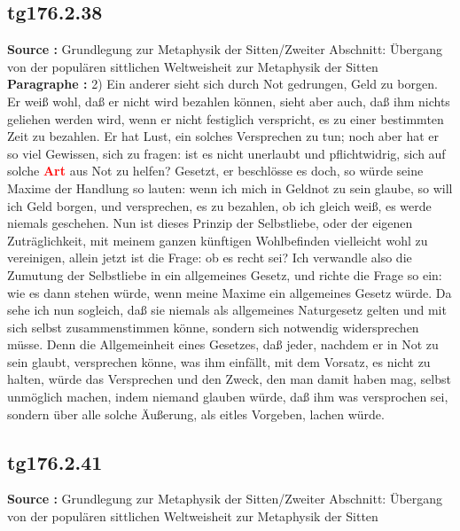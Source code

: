 \documentclass[a4paper,12pt,twoside]{book}
\newcommand{\match}[1]{\textcolor{red}{\textbf{#1}}}
\begin{document}
	\subsection*{tg176.2.38} 
	\textbf{Source : }Grundlegung zur Metaphysik der Sitten/Zweiter Abschnitt: Übergang von der populären sittlichen Weltweisheit zur Metaphysik der Sitten\\  
	
	\noindent\textbf{Paragraphe : }2) Ein anderer sieht sich durch Not gedrungen, Geld zu borgen. Er weiß wohl, daß er nicht wird bezahlen können, sieht aber auch, daß ihm nichts geliehen werden wird, wenn er nicht festiglich verspricht, es zu einer bestimmten Zeit zu bezahlen. Er hat Lust, ein solches Versprechen zu tun; noch aber hat er so viel Gewissen, sich zu fragen: ist es nicht unerlaubt und pflichtwidrig, sich auf solche \match{Art} aus Not zu helfen? Gesetzt, er beschlösse es doch, so würde seine Maxime der Handlung so lauten: wenn ich mich in Geldnot zu sein glaube, so will ich Geld borgen, und versprechen, es zu bezahlen, ob ich gleich weiß, es werde niemals geschehen. Nun ist dieses Prinzip der Selbstliebe, oder der eigenen Zuträglichkeit, mit meinem ganzen künftigen Wohlbefinden vielleicht wohl zu vereinigen, allein jetzt ist die Frage: ob es recht sei? Ich verwandle also die Zumutung der Selbstliebe in ein allgemeines Gesetz, und richte die Frage so ein: wie es dann stehen würde, wenn meine Maxime ein allgemeines Gesetz würde. Da sehe ich nun sogleich, daß sie niemals als allgemeines Naturgesetz gelten und mit sich selbst zusammenstimmen könne, sondern sich notwendig widersprechen müsse. Denn die Allgemeinheit eines Gesetzes, daß jeder, nachdem er in Not zu sein glaubt, versprechen könne, was ihm einfällt, mit dem Vorsatz, es nicht zu halten, würde das Versprechen und den Zweck, den man damit haben mag, selbst unmöglich machen, indem niemand glauben würde, daß ihm was versprochen sei, sondern über alle solche Äußerung, als eitles Vorgeben, lachen würde. 
	
	\subsection*{tg176.2.41} 
	\textbf{Source : }Grundlegung zur Metaphysik der Sitten/Zweiter Abschnitt: Übergang von der populären sittlichen Weltweisheit zur Metaphysik der Sitten\\  
	
\end{document}
